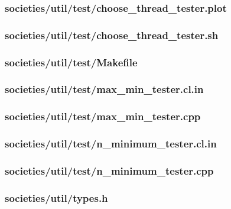 \documentclass{article}
\begin{document}
\subsubsection*{societies/util/test/choose\_thread\_tester.plot}


\subsubsection*{societies/util/test/choose\_thread\_tester.sh}


\subsubsection*{societies/util/test/Makefile}


\subsubsection*{societies/util/test/max\_min\_tester.cl.in}


\subsubsection*{societies/util/test/max\_min\_tester.cpp}


\subsubsection*{societies/util/test/n\_minimum\_tester.cl.in}


\subsubsection*{societies/util/test/n\_minimum\_tester.cpp}


\subsubsection*{societies/util/types.h}

\fi
\end{document}
